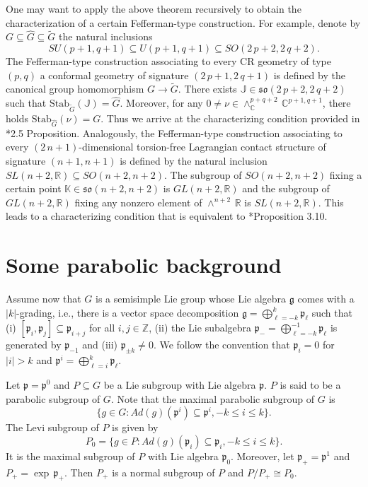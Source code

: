 \documentclass[11pt]{amsart}
\begin{document}
One may want to apply the above theorem recursively to obtain the characterization of a certain Fefferman-type construction. For example, denote by $G\subseteq\hat G\subseteq\tilde G$ the natural inclusions
\[SU(p+1,q+1)\subseteq U(p+1,q+1)\subseteq SO(2\,p+2,2\,q+2).\] The Fefferman-type construction associating to every CR geometry of type $(p,q)$ a conformal geometry of signature $(2\,p+1,2\,q+1)$ is defined by the canonical group homomorphism $G\to\tilde G$. There exists $\mathbb J\in\mathfrak{so}(2\,p+2,2\,q+2)$ such that $\mathrm{Stab}_{\tilde G}(\mathbb J)=\hat G$. Moreover, for any $0\neq\nu\in\wedge^{p+q+2}_{\mathbb C}\,\mathbb C^{p+1,q+1}$, there holds $\mathrm{Stab}_{\hat G}(\nu)=G$. Thus we arrive at the characterizing condition provided in \cite{CG06}*{2.5 Proposition}. Analogously, the Fefferman-type construction associating to every $(2\,n+1)$-dimensional torsion-free Lagrangian contact structure of signature $(n+1,n+1)$ is defined by the natural inclusion $SL(n+2,\mathbb R)\subseteq  SO(n+2,n+2)$. The subgroup of $SO(n+2,n+2)$ fixing a certain point $\mathbb K\in\mathfrak{so}(n+2,n+2)$ is $GL(n+2,\mathbb R)$ and the subgroup of $GL(n+2,\mathbb R)$ fixing any nonzero element of $\wedge^{n+2}\,\mathbb R$ is $SL(n+2,\mathbb R)$. This leads to a characterizing condition that is equivalent to \cite{Ham+17}*{Proposition 3.10}.


\section{Some parabolic background}\label{2}
Assume now that $G$ is a semisimple Lie group whose Lie algebra $\mathfrak g$ comes with a $|k|$-grading, i.e., there is a vector space decomposition $\mathfrak g=\bigoplus_{\ell=-k}^{k}\mathfrak p_\ell$ such that (i) $[\mathfrak p_i,\mathfrak p_j]\subseteq\mathfrak p_{i+j}$ for all $i,j\in\mathbb Z$, (ii) the Lie subalgebra $\mathfrak p_-=\bigoplus_{\ell=-k}^{-1}\mathfrak p_\ell$ is generated by $\mathfrak p_{-1}$ and (iii) $\mathfrak p_{\pm k}\neq 0$. We follow the convention that $\mathfrak p_i=0$ for $|i|>k$ and $\mathfrak p^i=\bigoplus_{\ell=i}^{k}\mathfrak p_\ell$.

Let $\mathfrak p=\mathfrak p^0$ and $P\subseteq G$ be a Lie subgroup with Lie algebra $\mathfrak p$. $P$ is said to be a parabolic subgroup of $G$. Note that the maximal parabolic subgroup of $G$ is
\[\{g\in G:Ad(g)(\mathfrak p^i)\subseteq\mathfrak p^i,-k\leq i\leq k\}.\]
The Levi subgroup of $P$ is given by
\[P_0=\{g\in P:Ad(g)(\mathfrak p_i)\subseteq\mathfrak p_i,-k\leq i\leq k\}.\]
It is the maximal subgroup of $P$ with Lie algebra $\mathfrak p_0$. Moreover, let $\mathfrak p_+=\mathfrak p^1$ and $P_+=\exp\,\mathfrak p_+$. Then $P_+$ is a normal subgroup of $P$ and $P/P_+\cong P_0$.
\end{document}
